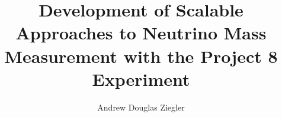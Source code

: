 \documentclass[phd,12pt]{psuthesis}
\title{Development of Scalable Approaches to Neutrino Mass Measurement with the Project 8 Experiment}
\author{Andrew Douglas Ziegler}
\begin{document}
\pagestyle{fancy}
\fancyhead[L,C,R]{}
\fancyfoot[L,R]{}
\fancyfoot[C]{\thepage}
\renewcommand{\headrulewidth}{0pt}
\renewcommand{\footrulewidth}{0pt}
\linenumbers
\frontmatter

%

\psutitlepage

\psucommitteepage


\thesistableofcontents

\begin{singlespace}
\renewcommand{\listfigurename}{\sffamily\Huge List of Figures}
\setlength{\cftparskip}{\baselineskip}
\listoffigures %
\end{singlespace}
\clearpage

\begin{singlespace}
\renewcommand{\listtablename}{\sffamily\Huge List of Tables}
\setlength{\cftparskip}{\baselineskip}
\listoftables %
\end{singlespace}
\clearpage

\end{document}

